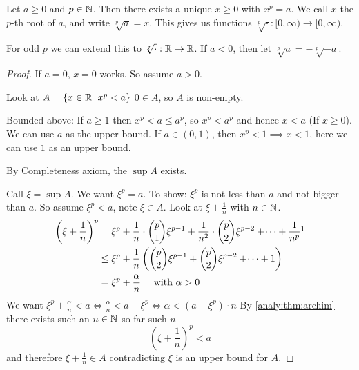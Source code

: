 \documentclass[10pt, a4paper]{article}
\begin{document}
\begin{theorem}
    Let $a \geq 0$ and $p \in \mathbb{N}$.
    Then there exists a unique $x \geq 0$ with $x ^ p = a$.
    We call $x$ the $p$-th root of $a$,
    and write $\sqrt[p]{a} = x$.
    This gives us functions $\sqrt[p]{\cdot} : [0, \infty) \to [0, \infty)$.

    For odd $p$ we can extend this to $\sqrt[p]{\cdot} : \mathbb{R} \to \mathbb{R}$.
    If $a < 0$, then let $\sqrt[p]{a} = -\sqrt[p]{-a}$.
    \begin{proof}
        If $a = 0$, $x = 0$ works.
        So assume $a > 0$.

        Look at $A = \{x \in \mathbb{R}\,|\, x ^ p < a\}$
        $0 \in A$, so $A$ is non-empty.

        Bounded above: If $a \geq 1$ then $x ^ p < a \leq a ^ p$,
        so $x ^ p < a ^ p$ and hence $x < a$ (If $x \geq 0$). We can use $a$ as the upper bound.
        If $a \in (0, 1)$, then $x ^ p < 1 \implies x < 1$, here we can use $1$ as an upper bound.
        
        By Completeness axiom, the $\sup A$ exists. 
        
        Call $\xi = \sup A$.
        We want $\xi ^ p = a$.
        To show: $\xi ^ p$ is not less than $a$ and not bigger than $a$.
        So assume $\xi ^ p < a$, note $\xi \in A$.
        Look at $\xi + \frac{1}{n}$ with $n \in \mathbb{N}$.
        \begin{align*}
            \left(\xi + \frac{1}{n}\right) ^ p &= \xi ^ p + \frac{1}{n} \cdot \binom{p}{1} \xi ^ {p - 1} + \frac{1}{n ^ 2} \cdot \binom{p}{2} \xi ^ {p - 2} + \dotsi + \frac{1}{n ^ p}\footnotemark \\
            &\leq \xi ^ p + \frac{1}{n}\left(\binom{p}{2}\xi ^ {p - 1} + \binom{p}{2}\xi ^ {p - 2} + \dotsi + 1\right) \\
            &= \xi ^ p + \frac{\alpha}{n}\quad\text{ with } \alpha > 0
        \end{align*}
        We want $\xi ^ p + \frac{\alpha}{n} < a \iff \frac{\alpha}{n} < a - \xi ^ p \iff \alpha < \left(a - \xi ^ p\right) \cdot n$ By \autoref{analy:thm:archim} there exists such an $n \in \mathbb{N}$
        so far such $n$
        \[
        \left(\xi + \frac{1}{n}\right) ^ p < a
        \]
        and therefore $\xi + \frac{1}{n} \in A$ contradicting $\xi$ is an upper bound for $A$.


\end{proof}
\end{theorem}
\end{document}
